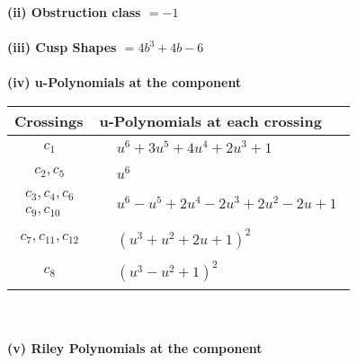 \documentclass[1p]{elsarticle_modified}
\theoremstyle{definition}
\begin{document}
\flushleft \textbf{(ii) Obstruction class $= -1$}\\~\\
\flushleft \textbf{(iii) Cusp Shapes $= 4 b^3+4 b-6$}\\~\\
\newpage\renewcommand{\arraystretch}{1}
\flushleft \textbf{(iv) u-Polynomials at the component}\newline \\
\begin{tabular}{m{50pt}|m{274pt}}
Crossings & \hspace{64pt}u-Polynomials at each crossing \\
\hline $$\begin{aligned}c_{1}\end{aligned}$$&$\begin{aligned}
&u^6+3 u^5+4 u^4+2 u^3+1
\end{aligned}$\\
\hline $$\begin{aligned}c_{2},c_{5}\end{aligned}$$&$\begin{aligned}
&u^6
\end{aligned}$\\
\hline $$\begin{aligned}c_{3},c_{4},c_{6}\\c_{9},c_{10}\end{aligned}$$&$\begin{aligned}
&u^6- u^5+2 u^4-2 u^3+2 u^2-2 u+1
\end{aligned}$\\
\hline $$\begin{aligned}c_{7},c_{11},c_{12}\end{aligned}$$&$\begin{aligned}
&(u^3+u^2+2 u+1)^2
\end{aligned}$\\
\hline $$\begin{aligned}c_{8}\end{aligned}$$&$\begin{aligned}
&(u^3- u^2+1)^2
\end{aligned}$\\
\hline
\end{tabular}\\~\\
\newpage\renewcommand{\arraystretch}{1}
\flushleft \textbf{(v) Riley Polynomials at the component}\newline \\
\end{document}

